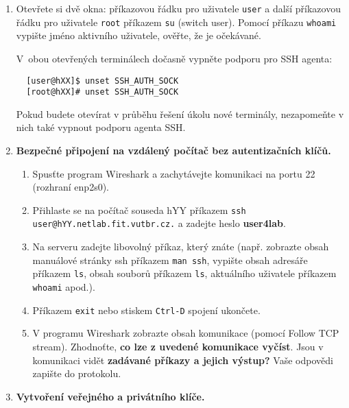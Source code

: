 \documentclass[a4paper,11pt]{article}
\begin{document}
\begin{enumerate}

  \item Otevřete si dvě okna: příkazovou řádku pro uživatele {\tt user} a další
    příkazovou řádku pro uživatele {\tt root} příkazem {\tt su} (switch user).
Pomocí příkazu {\tt whoami} vypište jméno aktivního uživatele, ověřte, že je
    očekávané.

    V~obou otevřených terminálech dočasně vypněte podporu pro SSH agenta:
  \begin{lstlisting}
  [user@hXX]$ unset SSH_AUTH_SOCK
  [root@hXX]# unset SSH_AUTH_SOCK
  \end{lstlisting}

  Pokud budete otevírat v průběhu řešení úkolu nové terminály, nezapomeňte
  v nich také vypnout podporu agenta SSH.

  \item {\bf Bezpečné připojení na vzdálený počítač bez autentizačních klíčů.}

    \begin{enumerate}

      \item Spusťte program Wireshark a zachytávejte komunikaci na portu 22
        (rozhraní enp2s0).

      \item Přihlaste se na počítač souseda hYY příkazem {\tt ssh user@hYY.netlab.fit.vutbr.cz.} a zadejte heslo \textbf{user4lab}.

      \item Na serveru zadejte libovolný příkaz, který znáte (např. zobrazte
        obsah manuálové stránky ssh příkazem {\tt man ssh}, vypište
        obsah adresáře příkazem {\tt ls}, obsah souborů příkazem {\tt ls},
        aktuálního uživatele příkazem {\tt whoami} apod.).

      \item Příkazem {\tt exit} nebo stiskem {\tt Ctrl-D} spojení ukončete.

      \item V programu Wireshark zobrazte obsah komunikace (pomocí Follow TCP stream).
        Zhodnoťte, \textbf{co lze z uvedené komunikace vyčíst}. Jsou v komunikaci vidět
        \textbf{zadávané příkazy a jejich výstup?} Vaše odpovědi zapište do protokolu.


    \end{enumerate}

  \item {\bf Vytvoření veřejného a privátního klíče.}


\end{enumerate}
\end{document}
